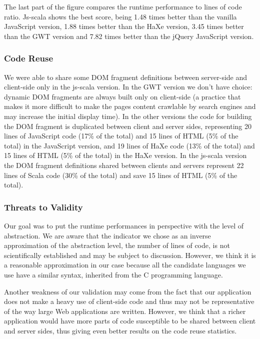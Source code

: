 \documentclass[preprint]{sigplanconf}
\begin{document}
The last part of the figure compares the runtime performance to lines of code ratio. Js-scala shows
the best score, being 1.48 times better than the vanilla JavaScript version, 1.88 times better than
the HaXe version, 3.45 times better than the GWT version and 7.82 times better than the jQuery
JavaScript version.

\subsubsection{Code Reuse}

We were able to share some DOM fragment definitions between server-side and client-side only in
the js-scala version. In the GWT version we don’t have choice: dynamic DOM fragments are always
built only on client-side (a practice that makes it more difficult to make the pages content
crawlable by search engines and may increase the initial display time). In the other versions the
code for building the DOM fragment is duplicated between client and server sides, representing 20
lines of JavaScript code (17\% of the total) and 15 lines of HTML (5\% of the total) in the
JavaScript version, and 19 lines of HaXe code (13\% of the total) and 15 lines of HTML (5\%
of the total) in the HaXe version. In the js-scala version the DOM fragment definitions shared
between clients and servers represent 22 lines of Scala code (30\% of the total) and save 15 lines
of HTML (5\% of the total).

\subsubsection{Threats to Validity}

Our goal was to put the runtime performances in perspective with the level of abstraction. We are
aware that the indicator we chose as an inverse approximation of the abstraction level, the number
of lines of code, is not scientifically established and may be subject to discussion. However, we
think it is a reasonable approximation in our case because all the candidate languages we use have
a similar syntax, inherited from the C programming language.

Another weakness of our validation may come from the fact that our application does not make a
heavy use of client-side code and thus may not be representative of the way large Web applications
are written. However, we think that a richer application would have more parts of code susceptible
to be shared between client and server sides, thus giving even better results on the code reuse
statistics.
\end{document}
